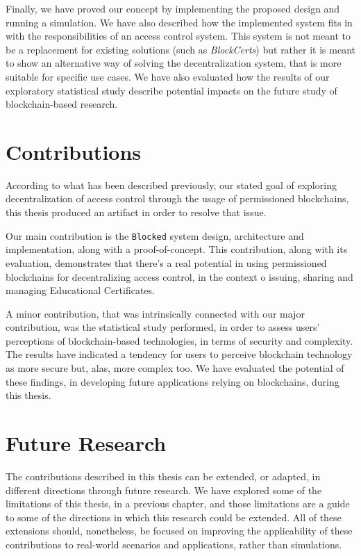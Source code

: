 Finally, we have proved our concept by implementing the proposed design and running a simulation. We have also described how the implemented system fits in with the responsibilities of an access control system. This system is not meant to be a replacement for existing solutions (such as \emph{BlockCerts}) but rather it is meant to show an alternative way of solving the decentralization system, that is more suitable for specific use cases. We have also evaluated how the results of our exploratory statistical study describe potential impacts on the future study of blockchain-based research.

\section{Contributions}

According to what has been described previously, our stated goal of exploring decentralization of access control through the usage of permissioned blockchains, this thesis produced an artifact in order to resolve that issue.

Our main contribution is the \texttt{Blocked} system design, architecture and implementation, along with a proof-of-concept. This contribution, along with its evaluation, demonstrates that there's a real potential in using permissioned blockchains for decentralizing access control, in the context o issuing, sharing and managing Educational Certificates.

A minor contribution, that was intrinsically connected with our major contribution, was the statistical study performed, in order to assess users' perceptions of blockchain-based technologies, in terms of security and complexity. The results have indicated a tendency for users to perceive blockchain technology as more secure but, alas, more complex too. We have evaluated the potential of these findings, in developing future applications relying on blockchains, during this thesis.

\section{Future Research}

The contributions described in this thesis can be extended, or adapted, in different directions through future research. We have explored some of the limitations of this thesis, in a previous chapter, and those limitations are a guide to some of the directions in which this research could be extended. All of these extensions should, nonetheless, be focused on improving the applicability of these contributions to real-world scenarios and applications, rather than simulations.

